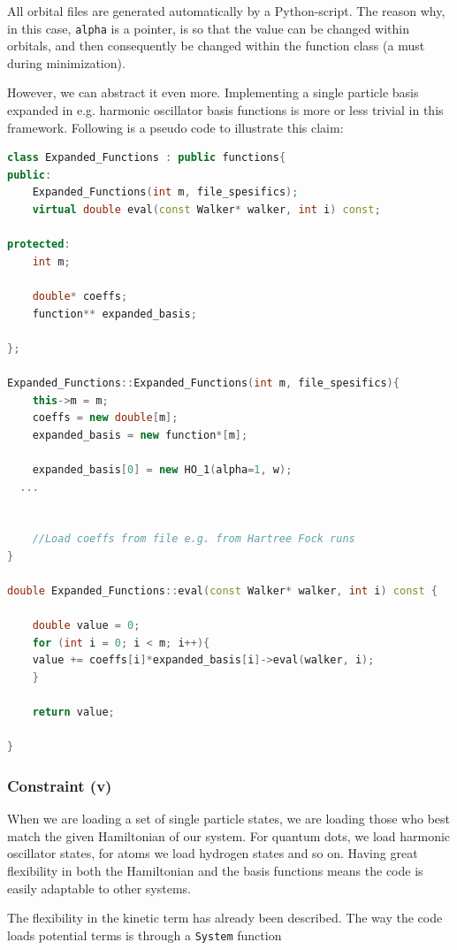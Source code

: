 All orbital files are generated automatically by a Python-script. The reason why, in this case, \verb+alpha+ is a pointer, is so that the value can be changed within orbitals, and then consequently be changed within the function class (a must during minimization). 

However, we can abstract it even more. Implementing a single particle basis expanded in e.g. harmonic oscillator basis functions is more or less trivial in this framework. Following is a pseudo code to illustrate this claim:

\vspace{0.5cm}
\begin{lstlisting}[language=C++]
class Expanded_Functions : public functions{
public:
    Expanded_Functions(int m, file_spesifics);
    virtual double eval(const Walker* walker, int i) const;

protected:
    int m;                     
  
    double* coeffs;            
    function** expanded_basis;
  
};

Expanded_Functions::Expanded_Functions(int m, file_spesifics){
    this->m = m;
    coeffs = new double[m];
    expanded_basis = new function*[m];
  
    expanded_basis[0] = new HO_1(alpha=1, w);
  ...
  
  
    //Load coeffs from file e.g. from Hartree Fock runs
}

double Expanded_Functions::eval(const Walker* walker, int i) const {
    
    double value = 0;
    for (int i = 0; i < m; i++){
	value += coeffs[i]*expanded_basis[i]->eval(walker, i);
    }

    return value;

}
\end{lstlisting}


\subsubsection{Constraint (v)}

When we are loading a set of single particle states, we are loading those who best match the given Hamiltonian of our system. For quantum dots, we load harmonic oscillator states, for atoms we load hydrogen states and so on. Having great flexibility in both the Hamiltonian and the basis functions means the code is easily adaptable to other systems. 

The flexibility in the kinetic term has already been described. The way the code loads potential terms is through a \verb+System+ function 

